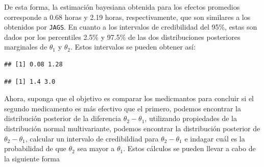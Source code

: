 \begin{Eje}
De esta forma, la estimación bayesiana obtenida para los efectos promedios corresponde a 0.68 horas y 2.19 horas, respectivamente, que son similares a los obtenidos por \verb'JAGS'. En cuanto a los intervalos de credibilidad del 95\%, estas son dados por los percentiles 2.5\% y 97.5\% de las dos distribuciones posteriores marginales de $\theta_1$ y $\theta_2$. Estos intervalos se pueden obtener así:
\begin{knitrout}
\color{fgcolor}\begin{kframe}
\begin{alltt}
\hlstd{(}\hlstd{(}\hlstd{,}\hlstd{),mu.n[}\hlstd{],}\hlstd{(Gamma.n[}\hlstd{,}\hlstd{]))}
\end{alltt}
\begin{verbatim}
## [1] 0.08 1.28
\end{verbatim}
\begin{alltt}
\hlstd{(}\hlstd{(}\hlstd{,}\hlstd{),mu.n[}\hlstd{],}\hlstd{(Gamma.n[}\hlstd{,}\hlstd{]))}
\end{alltt}
\begin{verbatim}
## [1] 1.4 3.0
\end{verbatim}
\end{kframe}
\end{knitrout}
Ahora, suponga que el objetivo es comparar los medicmantos para concluir si el segundo medicamento es más efectivo que el primero, podemos encontrar la distribución posterior de la diferencia $\theta_2-\theta_1$, utilizando propiedades de la distribución normal multivariante, podemos encontrar la distribución posterior de $\theta_2-\theta_1$, calcular un intervalo de credibildiad para $\theta_2-\theta_1$ e indagar cuál es la probabilidad de que $\theta_2$ sea mayor a $\theta_1$. Estos cálculos se pueden llevar a cabo de la siguiente forma
\begin{knitrout}
\color{fgcolor}
\end{knitrout}
\end{Eje}
